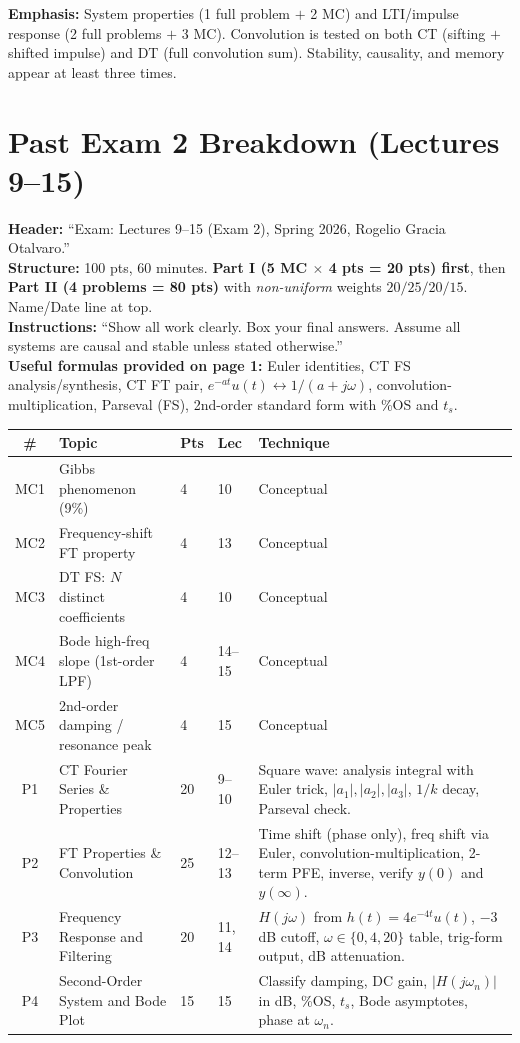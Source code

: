 \documentclass[11pt]{article}
\begin{document}
\noindent\textbf{Emphasis:} System properties (1 full problem $+$ 2 MC) and LTI/impulse response (2 full problems $+$ 3 MC). Convolution is tested on both CT (sifting $+$ shifted impulse) and DT (full convolution sum). Stability, causality, and memory appear at least three times.

\section{Past Exam 2 Breakdown (Lectures 9--15)}

\textbf{Header:} ``Exam: Lectures 9--15 (Exam 2), Spring 2026, Rogelio Gracia Otalvaro.''\\
\textbf{Structure:} 100 pts, 60 minutes. \textbf{Part I (5 MC $\times$ 4 pts = 20 pts) first}, then \textbf{Part II (4 problems = 80 pts)} with \emph{non-uniform} weights $20 / 25 / 20 / 15$. Name/Date line at top.\\
\textbf{Instructions:} ``Show all work clearly. Box your final answers. Assume all systems are causal and stable unless stated otherwise.''\\
\textbf{Useful formulas provided on page 1:} Euler identities, CT FS analysis/synthesis, CT FT pair, $e^{-at}u(t)\leftrightarrow 1/(a+j\omega)$, convolution-multiplication, Parseval (FS), 2nd-order standard form with \%OS and $t_s$.

\begin{longtable}{@{}clp{1.4cm}p{1.4cm}p{5.6cm}@{}}
\toprule
\# & Topic & Pts & Lec & Technique \\
\midrule
\endhead
MC1 & Gibbs phenomenon (9\%) & 4 & 10 & Conceptual \\
MC2 & Frequency-shift FT property & 4 & 13 & Conceptual \\
MC3 & DT FS: $N$ distinct coefficients & 4 & 10 & Conceptual \\
MC4 & Bode high-freq slope (1st-order LPF) & 4 & 14--15 & Conceptual \\
MC5 & 2nd-order damping / resonance peak & 4 & 15 & Conceptual \\
P1 & CT Fourier Series \& Properties & 20 & 9--10 & Square wave: analysis integral with Euler trick, $|a_1|,|a_2|,|a_3|$, $1/k$ decay, Parseval check. \\
P2 & FT Properties \& Convolution & 25 & 12--13 & Time shift (phase only), freq shift via Euler, convolution-multiplication, 2-term PFE, inverse, verify $y(0)$ and $y(\infty)$. \\
P3 & Frequency Response and Filtering & 20 & 11, 14 & $H(j\omega)$ from $h(t)=4e^{-4t}u(t)$, $-3$ dB cutoff, $\omega\in\{0,4,20\}$ table, trig-form output, dB attenuation. \\
P4 & Second-Order System and Bode Plot & 15 & 15 & Classify damping, DC gain, $|H(j\omega_n)|$ in dB, \%OS, $t_s$, Bode asymptotes, phase at $\omega_n$. \\
\bottomrule
\end{longtable}
\end{document}
